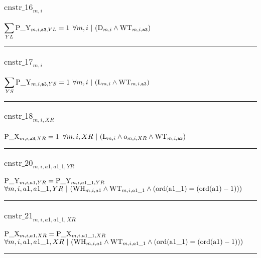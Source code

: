 \documentclass[11pt]{article}
\begin{document}
\subsubsection*{$\text{cnstr\_16}_{m, i}$} \label{cnstr_16}
$
\displaystyle \sum_{YL}\textcolor{black}{\text{P\_Y}}_{m, i, \texttt{a3}, YL} = 1
$
\hfill
$
\forall{ m, i}  ~ | ~ ( \textcolor{black}{\text{D}}_{m, i} \wedge \textcolor{black}{\text{WT}}_{m, i, \texttt{a3}} )
$ \vspace{5pt}
\hrule 
\subsubsection*{$\text{cnstr\_17}_{m, i}$} \label{cnstr_17}
$
\displaystyle \sum_{YS}\textcolor{black}{\text{P\_Y}}_{m, i, \texttt{a3}, YS} = 1
$
\hfill
$
\forall{ m, i}  ~ | ~ ( \textcolor{black}{\text{L}}_{m, i} \wedge \textcolor{black}{\text{WT}}_{m, i, \texttt{a3}} )
$ \vspace{5pt}
\hrule 
\subsubsection*{$\text{cnstr\_18}_{m, i, XR}$} \label{cnstr_18}
$
\textcolor{black}{\text{P\_X}}_{m, i, \texttt{a3}, XR} = 1
$
\hfill
$
\forall{ m, i, XR}  ~ | ~ ( \textcolor{black}{\text{L}}_{m, i} \wedge \textcolor{black}{\text{o}}_{m, i, XR} \wedge \textcolor{black}{\text{WT}}_{m, i, \texttt{a3}} )
$ \vspace{5pt}
\hrule 
\subsubsection*{$\text{cnstr\_20}_{m, i, a1, a1\_1, YR}$} \label{cnstr_20}
$
\textcolor{black}{\text{P\_Y}}_{m, i, a1, YR} = \textcolor{black}{\text{P\_Y}}_{m, i, a1\_1, YR}
$
\hfill
$
\forall{ m, i, a1, a1\_1, YR}  ~ | ~ ( \textcolor{black}{\text{WH}}_{m, i, a1} \wedge \textcolor{black}{\text{WT}}_{m, i, a1\_1} \wedge  (  \text{ord}( \textcolor{black}{\text{a1\_1}} )   =   (  \text{ord}( \textcolor{black}{\text{a1}} )  - 1 )  )  )
$ \vspace{5pt}
\hrule 
\subsubsection*{$\text{cnstr\_21}_{m, i, a1, a1\_1, XR}$} \label{cnstr_21}
$
\textcolor{black}{\text{P\_X}}_{m, i, a1, XR} = \textcolor{black}{\text{P\_X}}_{m, i, a1\_1, XR}
$
\hfill
$
\forall{ m, i, a1, a1\_1, XR}  ~ | ~ ( \textcolor{black}{\text{WH}}_{m, i, a1} \wedge \textcolor{black}{\text{WT}}_{m, i, a1\_1} \wedge  (  \text{ord}( \textcolor{black}{\text{a1\_1}} )   =   (  \text{ord}( \textcolor{black}{\text{a1}} )  - 1 )  )  )
$ \vspace{5pt}
\hrule 
\end{document}
